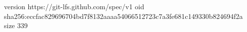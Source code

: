version https://git-lfs.github.com/spec/v1
oid sha256:eccfac829696704bd7f8132aaaa54066512723c7a3fe681c149330b824694f2a
size 339
